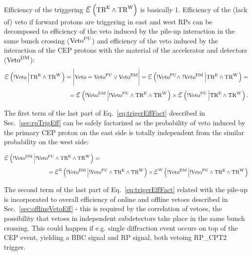 Efficiency of the triggering $\mbox{\LARGE$\varepsilon$}\left(\TRE\land\TRW\right)$ is basically 1. Efficiency of the (lack of) veto if forward protons are triggering in east and west RPs can be decomposed to efficiency of the veto induced by the pile-up interaction in the same bunch crossing ($\text{Veto}^{\text{PU}}$) and efficiency of the veto induced by the interaction of the CEP protons with the material of the accelerator and detectors ($\text{Veto}^{\text{DM}}$):
\begin{equation}\label{eq:trigerEffFact}
\begin{split}
\mbox{\LARGE$\varepsilon$}\left(!\V\left|\TRE\land\TRW\right.\right)=\Bigg|\V=\Vpu\vee\Vdm\Bigg|=\mbox{\LARGE$\varepsilon$}\left(!\Vpu\land~!\Vdm\left|\TRE\land\TRW\right.\right) = \\ 
= \mbox{\LARGE$\varepsilon$}\left(!\Vdm\left|!\Vpu\land\TRE\land\TRW\right.\right) \times \mbox{\LARGE$\varepsilon$}\left(!\Vpu\left|\TRE\land\TRW\right.\right).
\end{split}
\end{equation}

The first term of the last part of Eq.~\eqref{eq:trigerEffFact} described in Sec.~\ref{sec:rpTrigEff} can be safely factorized as the probability of veto induced by the primary CEP proton on the east side is totally independent from the similar probability on the west side:

\begin{equation}
\begin{split}
\mbox{\LARGE$\varepsilon$}\left(!\Vdm\left|!\Vpu\land\TRE\land\TRW\right.\right) = ~~~~~~~~~~~~~~~~~~~~~~~~~~~~~~~~~~~~~~~~~~~~~~~~~~~~~~~~~~~~~~~~~~~~~~~~~~~~~~~~~~\\ 
=\mbox{\LARGE$\varepsilon$}^{\text{E}}\left(!\Vdm\left|!\Vpu\land\TRE\land\TRW\right.\right) \times \mbox{\LARGE$\varepsilon$}^{\text{W}}\left(!\Vdm\left|!\Vpu\land\TRE\land\TRW\right.\right)
\end{split}
\end{equation}

The second term of the last part of Eq.~\eqref{eq:trigerEffFact} related with the pile-up is incorporated to overall efficiency of online and offline vetoes described in Sec.~\ref{sec:offlineVetoEff} - this is required by the correlation of vetoes, the possibility that vetoes in independent subdetectors take place in the same bunch crossing. This could happen if e.g. single diffraction event occurs on top of the CEP event, yielding a BBC signal and RP signal, both vetoing RP\_CPT2 trigger.




